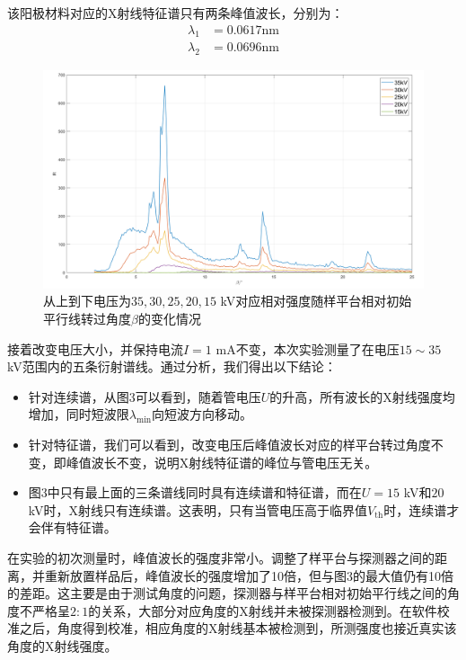 \documentclass[11pt,a4paper]{article}
\begin{document}
该阳极材料对应的X射线特征谱只有两条峰值波长，分别为：
\begin{equation}
\begin{aligned}
\lambda_1 &= 0.0617\text{nm} \\
\lambda_2 &= 0.0696\text{nm}
\end{aligned}
\end{equation}
\begin{figure}[H]
    \centering
    \includegraphics[width=1\textwidth]{voltage.png}
    \captionsetup{font=footnotesize}
    \caption{从上到下电压为$35, 30, 25, 20, 15$ kV对应相对强度随样平台相对初始平行线转过角度$\beta$的变化情况}
    \end{figure}
    
    接着改变电压大小，并保持电流$I=1$ mA不变，本次实验测量了在电压$15\sim35$ kV范围内的五条衍射谱线。通过分析，我们得出以下结论：
    
    \begin{itemize}
    \item 针对连续谱，从图3可以看到，随着管电压$U$的升高，所有波长的X射线强度均增加，同时短波限$\lambda_{\min}$向短波方向移动。
    \item 针对特征谱，我们可以看到，改变电压后峰值波长对应的样平台转过角度不变，即峰值波长不变，说明X射线特征谱的峰位与管电压无关。
    \item 图3中只有最上面的三条谱线同时具有连续谱和特征谱，而在$U=15$ kV和$20$ kV时，X射线只有连续谱。这表明，只有当管电压高于临界值$V_{\text{th}}$时，连续谱才会伴有特征谱。
    \end{itemize}
    
    在实验的初次测量时，峰值波长的强度非常小。调整了样平台与探测器之间的距离，并重新放置样品后，峰值波长的强度增加了10倍，但与图3的最大值仍有10倍的差距。这主要是由于测试角度的问题，探测器与样平台相对初始平行线之间的角度不严格呈$2:1$的关系，大部分对应角度的X射线并未被探测器检测到。在软件校准之后，角度得到校准，相应角度的X射线基本被检测到，所测强度也接近真实该角度的X射线强度。
    
\end{document}
